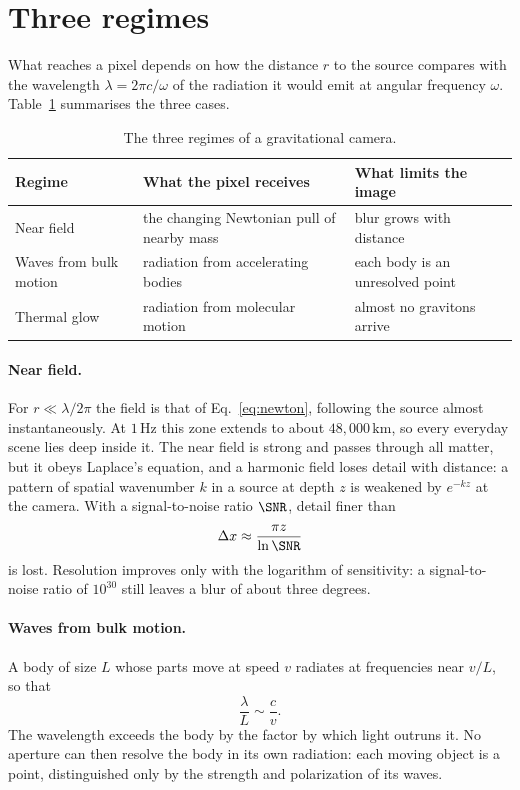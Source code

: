 \section{Three regimes}\label{sec:regimes}

What reaches a pixel depends on how the distance $r$ to the source compares
with the wavelength $\lambda = 2\pi c/\omega$ of the radiation it would emit
at angular frequency $\omega$. Table~\ref{tab:regimes} summarises the three
cases.

\begin{table}
\begin{tabular}{lll}
Regime & What the pixel receives & What limits the image \\ \hline
Near field & the changing Newtonian pull of nearby mass & blur grows with distance \\
Waves from bulk motion & radiation from accelerating bodies & each body is an unresolved point \\
Thermal glow & radiation from molecular motion & almost no gravitons arrive \\
\end{tabular}
\caption{The three regimes of a gravitational camera.}\label{tab:regimes}
\end{table}

\paragraph{Near field.} For $r \ll \lambda/2\pi$ the field is that of
Eq.~\eqref{eq:newton}, following the source almost instantaneously. At
$1\,\mathrm{Hz}$ this zone extends to about $48{,}000\,\mathrm{km}$, so every
everyday scene lies deep inside it. The near field is strong and passes through
all matter, but it obeys Laplace's equation, and a harmonic field loses detail
with distance: a pattern of spatial wavenumber $k$ in a source at depth $z$ is
weakened by $e^{-kz}$ at the camera. With a signal-to-noise ratio $\SNR$, detail
finer than
\begin{equation}\label{eq:resolution}
\Delta x \approx \frac{\pi z}{\ln \SNR}
\end{equation}
is lost. Resolution improves only with the logarithm of sensitivity: a
signal-to-noise ratio of $10^{30}$ still leaves a blur of about three degrees.

\paragraph{Waves from bulk motion.} A body of size $L$ whose parts move at
speed $v$ radiates at frequencies near $v/L$, so that
\begin{equation}\label{eq:unresolved}
\frac{\lambda}{L} \sim \frac{c}{v} .
\end{equation}
The wavelength exceeds the body by the factor by which light outruns it. No
aperture can then resolve the body in its own radiation: each moving object is
a point, distinguished only by the strength and polarization of its waves.

